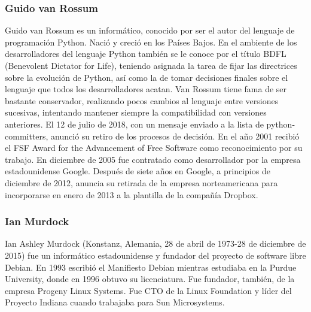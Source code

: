 \subsubsection{Guido van Rossum}
Guido van Rossum es un informático, conocido por ser el autor del lenguaje de programación Python. Nació y creció en los Países Bajos.
En el ambiente de los desarrolladores del lenguaje Python también se le conoce por el título BDFL (Benevolent Dictator for Life), teniendo asignada la tarea de fijar las directrices sobre la evolución de Python, así como la de tomar decisiones finales sobre el lenguaje que todos los desarrolladores acatan. Van Rossum tiene fama de ser bastante conservador, realizando pocos cambios al lenguaje entre versiones sucesivas, intentando mantener siempre la compatibilidad con versiones anteriores. El 12 de julio de 2018, con un mensaje enviado a la lista de python-committers, anunció su retiro de los procesos de decisión.
En el año 2001 recibió el FSF Award for the Advancement of Free Software como reconocimiento por su trabajo. En diciembre de 2005 fue contratado como desarrollador por la empresa estadounidense Google. Después de siete años en Google, a principios de diciembre de 2012, anuncia su retirada de la empresa norteamericana para incorporarse en enero de 2013 a la plantilla de la compañía Dropbox.

\subsubsection{Ian Murdock}
Ian Ashley Murdock (Konstanz, Alemania, 28 de abril de 1973-28 de diciembre de 2015) fue un informático estadounidense y fundador del proyecto de software libre Debian.
En 1993 escribió el Manifiesto Debian mientras estudiaba en la Purdue University, donde en 1996 obtuvo su licenciatura. Fue fundador, también, de la empresa Progeny Linux Systems. Fue CTO de la Linux Foundation y líder del Proyecto Indiana cuando trabajaba para Sun Microsystems.
